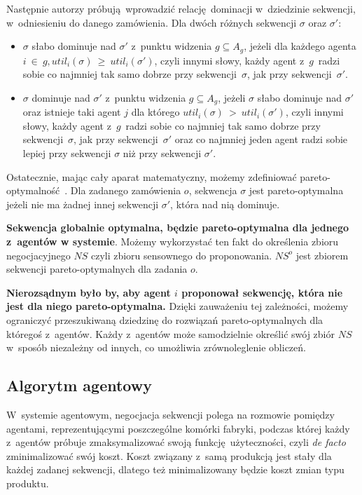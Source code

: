 Następnie autorzy próbują wprowadzić relację dominacji w~dziedzinie sekwencji, w~odniesieniu do danego zamówienia. Dla dwóch różnych sekwencji $\sigma$ oraz $\sigma'$:
\begin{itemize}
    \item $\sigma$ słabo dominuje nad $\sigma'$ z~punktu widzenia $g \subseteq A_{g}$, jeżeli dla każdego agenta $i~\in~g, util_{i}(\sigma)~\geq~util_{i}(\sigma')$, czyli innymi słowy, każdy agent z~$g$~radzi sobie co najmniej tak samo dobrze przy sekwencji~$\sigma$, jak przy sekwencji~$\sigma'$. 

    \item $\sigma$ dominuje nad $\sigma'$ z~punktu widzenia $g \subseteq A_{g}$, jeżeli $\sigma$ słabo dominuje nad $\sigma'$  oraz istnieje taki agent $j$ dla którego $util_{i}(\sigma)~>~util_{i}(\sigma')$, czyli innymi słowy, każdy agent z~$g$~radzi sobie co najmniej tak samo dobrze przy sekwencji~$\sigma$, jak przy sekwencji~$\sigma'$ oraz co najmniej jeden agent radzi sobie lepiej przy sekwencji $\sigma$ niż przy sekwencji $\sigma'$. 
\end{itemize}

Ostatecznie, mając cały aparat matematyczny, możemy zdefiniować pareto-optymalność~\cite{luce1958games}. Dla zadanego zamówienia $o$, sekwencja $\sigma$ jest pareto-optymalna jeżeli nie ma żadnej innej sekwencji $\sigma'$, która nad nią dominuje.

\textbf{Sekwencja globalnie optymalna, będzie pareto-optymalna dla jednego z~agentów w systemie}. Możemy wykorzystać ten fakt do określenia zbioru negocjacyjnego $NS$ czyli zbioru sensownego do proponowania. $NS^{o}$ jest zbiorem sekwencji pareto-optymalnych dla zadania $o$. 

\textbf{Nierozsądnym było by, aby agent $i$ proponował sekwencję, która nie jest dla niego pareto-optymalna.} Dzięki zauważeniu tej zależności, możemy ograniczyć przeszukiwaną dziedzinę do rozwiązań pareto-optymalnych dla któregoś z~agentów. Każdy z~agentów może samodzielnie określić swój zbiór $NS$ w~sposób niezależny od innych, co umożliwia zrównoleglenie obliczeń.


\subsection{Algorytm agentowy}
W~systemie agentowym, negocjacja sekwencji polega na rozmowie pomiędzy agentami, reprezentującymi poszczególne komórki fabryki, podczas której każdy z~agentów próbuje zmaksymalizować swoją funkcję użyteczności, czyli \emph{de facto} zminimalizować swój koszt. Koszt związany z~samą produkcją jest stały dla każdej zadanej sekwencji, dlatego też minimalizowany będzie koszt zmian typu produktu.

